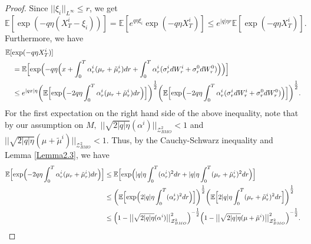\documentclass[10pt,a4paper]{article}
\newcommand{\be}{\begin{equation}}
\newcommand{\ee}{\end{equation}}
\theoremstyle{plain}
\theoremstyle{definition}
\numberwithin{equation}{section}
\begin{document}
\begin{proof}
 
Since $||\xi_{i}||_{L^{\infty}} \leq r$, we get
\be\label{equ:6.3}
\mathbb{E}[\exp(-q\eta(X_{T}^{i}-\xi_{i}))] = \mathbb{E}[e^{q\eta\xi_{i}}\exp(-{q\eta}X_{T}^{i})]   \leq e^{|q|\eta r}\mathbb{E}[\exp(-{q\eta}X_{T}^{i})].
\ee
Furthermore, we have
\begin{align}\nonumber
&\mathbb{E}[\exp(-{q\eta}X_{T}^{i})]\\
&\ \ \ = \mathbb{E}\Bigl[\exp\Bigl(-q\eta\Bigl(x + \int_{0}^{T}\alpha_{r}^{i}(\mu_{r}+\tilde{\mu}_{r}^{i})dr + \int_{0}^{T} \alpha_{r}^{i}(\sigma_{r}^{i}dW_{r}^{i}+\sigma_{r}^{0}dW_{r}^{0})\Bigr)\Bigr)\Bigr] \nonumber \\
&\ \ \ \leq e^{|qx|{\eta}}\biggl(\mathbb{E}\Bigl[\exp\Bigl(-2q\eta\int_{0}^{T}\alpha_{r}^{i}(\mu_{r}+\tilde{\mu}_{r}^{i})dr\Bigr)\Bigr]\biggr)^{\tfrac{1}{2}}\biggl(\mathbb{E}\Bigl[\exp\Bigl(-2q\eta\int_{0}^{T}\alpha_{r}^{i}(\sigma_{r}^{i}dW_{r}^{i}+\sigma_{r}^{0}dW_{r}^{0})\Bigr)\Bigr]\biggr)^{\tfrac{1}{2}}. \label{equ:6.4}
\end{align}
For the first expectation on the right hand side of the above inequality, note that by our assumption on $M,$ $\big|\big|\sqrt{2|q|\eta}(\alpha^{i})\big|\big|_{\mathcal{Z}_{BMO}^{2}} < 1$ and $\big|\big|\sqrt{2|q|\eta}(\mu+\tilde{\mu}^{i})\big|\big|_{\mathcal{Z}_{BMO}^{2}} < 1$. Thus, by the Cauchy-Schwarz inequality and Lemma \ref{Lemma2.3}, we have
\begin{align*}
\mathbb{E}\Bigl[\exp\Bigl(-2q\eta\int_{0}^{T}\alpha_{r}^{i}(\mu_{r}+\tilde{\mu}_{r}^{i})dr\Bigr)\Bigr] &\leq \mathbb{E}\Bigl[\exp\Bigl(|q|\eta\int_{0}^{T}(\alpha_{r}^{i})^{2}dr + |q|\eta\int_{0}^{T}(\mu_{r}+\tilde{\mu}_{r}^{i})^{2}dr\Bigr)\Bigr]\\
&\leq \biggl(\mathbb{E}\Bigl[\exp\Bigl(2|q|\eta\int_{0}^{T}(\alpha_{r}^{i})^{2}dr\Bigr)\Bigr]\biggr)^{\tfrac{1}{2}}\biggl(\mathbb{E}\Bigl[2|q|\eta\int_{0}^{T}(\mu_{r}+\tilde{\mu}_{r}^{i})^{2}dr\Bigr]\biggr)^{\tfrac{1}{2}}\\
&\leq \Bigl(1-\big|\big|\sqrt{2|q|\eta}(\alpha^{i})\big|\big|_{\mathcal{Z}_{BMO}^{2}}^{2}\Bigr)^{-\tfrac{1}{2}}\Bigl(1-\big|\big|\sqrt{2|q|\eta}(\mu+\tilde{\mu}^{i})\big|\big|_{\mathcal{Z}_{BMO}^{2}}^{2}\Bigr)^{-\tfrac{1}{2}}.
\end{align*}

\end{proof}
\end{document}
